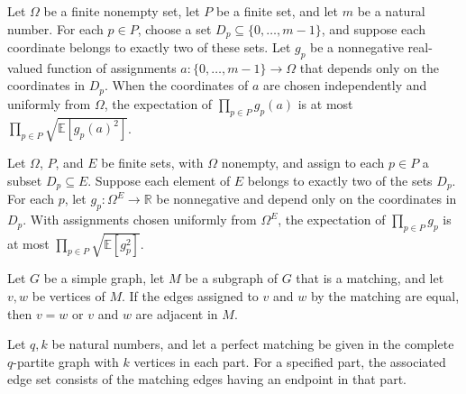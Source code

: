 \begin{theorem}
\label{FABL.uniform_expect_prod_le_prod_sqrt_expect_sq_twoRegular}
\leanok
{}
Let $\Omega$ be a finite nonempty set, let $P$ be a finite set, and let $m$ be a natural
number. For each $p\in P$, choose a set $D_p\subseteq\{0,\ldots,m-1\}$, and suppose each
coordinate belongs to exactly two of these sets. Let $g_p$ be a nonnegative real-valued
function of assignments $a:\{0,\ldots,m-1\}\to\Omega$ that depends only on the
coordinates in $D_p$. When the coordinates of $a$ are chosen independently and uniformly
from $\Omega$, the expectation of $\prod_{p\in P}g_p(a)$ is at most $\prod_{p\in
P}\sqrt{\mathbb E[g_p(a)^2]}$.
\end{theorem}

\begin{theorem}
\label{FABL.uniform_expect_prod_le_prod_sqrt_expect_sq_twoRegular_finite}
\leanok
{}
Let $\Omega$, $P$, and $E$ be finite sets, with $\Omega$ nonempty, and assign to each
$p\in P$ a subset $D_p\subseteq E$. Suppose each element of $E$ belongs to exactly two
of the sets $D_p$. For each $p$, let $g_p:\Omega^E\to\mathbb R$ be nonnegative and
depend only on the coordinates in $D_p$. With assignments chosen uniformly from
$\Omega^E$, the expectation of $\prod_{p\in P}g_p$ is at most $\prod_{p\in
P}\sqrt{\mathbb E[g_p^2]}$.
\end{theorem}

\begin{theorem}
\label{FABL.matching_eq_or_adj_of_toEdge_eq}
\leanok
{}
Let $G$ be a simple graph, let $M$ be a subgraph of $G$ that is a matching, and let
$v,w$ be vertices of $M$. If the edges assigned to $v$ and $w$ by the matching are
equal, then $v=w$ or $v$ and $w$ are adjacent in $M$.
\end{theorem}

\begin{definition}
\label{FABL.graphMatchingPartEdges}
\leanok
{}
Let $q,k$ be natural numbers, and let a perfect matching be given in the complete
$q$-partite graph with $k$ vertices in each part. For a specified part, the associated
edge set consists of the matching edges having an endpoint in that part.
\end{definition}

